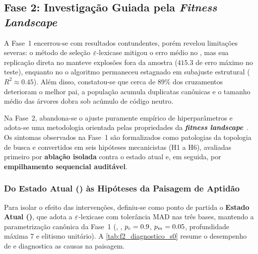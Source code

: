 \subsection{Fase 2: Investigação Guiada pela \emph{Fitness Landscape}}
\label{sec:fase2}

A Fase~1 encerrou-se com resultados contundentes, porém revelou limitações
severas: o método de seleção $\varepsilon$-lexicase mitigou o erro médio no
, mas sua replicação direta no  manteve explosões
fora da amostra ($415.3$ de erro máximo no teste), enquanto no 
o algoritmo permaneceu estagnado em subajuste estrutural ($R^2 \approx 0.45$).
Além disso, constatou-se que cerca de $89\%$ dos cruzamentos deterioram o
melhor pai, a população acumula duplicatas canônicas e o tamanho médio das
árvores dobra sob acúmulo de código neutro.

Na Fase~2, abandona-se o ajuste puramente empírico de hiperparâmetros e
adota-se uma metodologia orientada pelas propriedades da \textbf{\emph{fitness
landscape}}~\cite{wright1932roles}. Os sintomas observados na Fase~1 são
formalizados como patologias da topologia de busca e convertidos em seis
hipóteses mecanicistas (H1 a H6), avaliadas primeiro por \textbf{ablação
isolada} contra o estado atual e, em seguida, por \textbf{empilhamento
sequencial auditável}.

\subsubsection{Do Estado Atual () às Hipóteses da Paisagem de Aptidão}
\label{sec:f2_hipoteses}

Para isolar o efeito das intervenções, definiu-se como ponto de partida o
\textbf{Estado Atual ()}, que adota a $\varepsilon$-lexicase com tolerância
MAD nas três bases, mantendo a parametrização canônica da Fase~1
(, , $p_c=0.9$, $p_m=0.05$, profundidade máxima
7 e elitismo unitário). A \cref{tab:f2_diagnostico_s0} resume o desempenho de
 e diagnostica as causas na paisagem.

